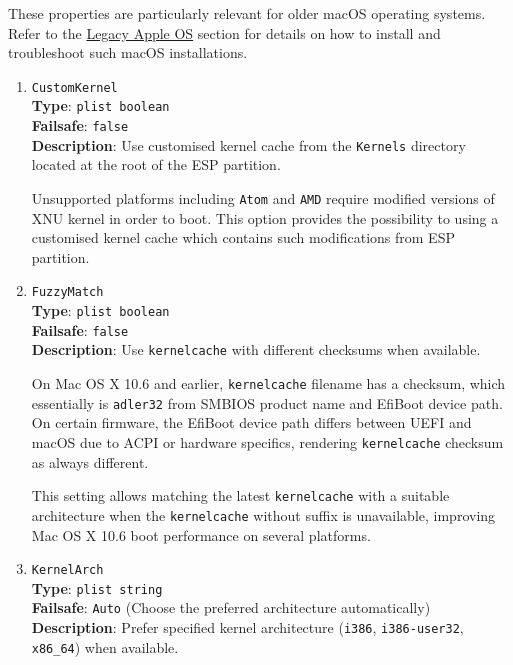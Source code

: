 \documentclass[]{article}
\begin{document}
These properties are particularly relevant for older macOS operating systems.
Refer to the \hyperref[legacyapple]{Legacy Apple OS} section for details on how
to install and troubleshoot such macOS installations.

\begin{enumerate}

\item
  \texttt{CustomKernel}\\
  \textbf{Type}: \texttt{plist\ boolean}\\
  \textbf{Failsafe}: \texttt{false}\\
  \textbf{Description}: Use customised kernel cache from the \texttt{Kernels}
  directory located at the root of the ESP partition.

  Unsupported platforms including \texttt{Atom} and \texttt{AMD} require modified versions
  of XNU kernel in order to boot. This option provides the possibility to using a customised
  kernel cache which contains such modifications from ESP partition.

\item
  \texttt{FuzzyMatch}\\
  \textbf{Type}: \texttt{plist\ boolean}\\
  \textbf{Failsafe}: \texttt{false}\\
  \textbf{Description}: Use \texttt{kernelcache} with different checksums when available.

  On Mac OS X 10.6 and earlier, \texttt{kernelcache} filename has a checksum, which essentially
  is \texttt{adler32} from SMBIOS product name and EfiBoot device path. On certain firmware,
  the EfiBoot device path differs between UEFI and macOS due to ACPI or hardware specifics,
  rendering \texttt{kernelcache} checksum as always different.

  This setting allows matching the latest \texttt{kernelcache} with a suitable architecture
  when the \texttt{kernelcache} without suffix is unavailable, improving Mac OS X 10.6 boot
  performance on several platforms.

\item
  \texttt{KernelArch}\\
  \textbf{Type}: \texttt{plist\ string}\\
  \textbf{Failsafe}: \texttt{Auto} (Choose the preferred architecture automatically)\\
  \textbf{Description}: Prefer specified kernel architecture (\texttt{i386},
  \texttt{i386-user32}, \texttt{x86\_64}) when available.


\end{enumerate}
\end{document}
